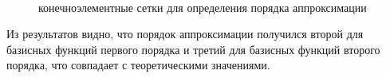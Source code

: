 \documentclass[a4paper,12pt]{article}
\begin{document}
\begin{figure}[H]
	\centering
	~~~~~
	\caption{конечноэлементные сетки для определения порядка аппроксимации}
	\label{fig:verify:x2_x4}
\end{figure}

Из результатов видно, что порядок аппроксимации получился второй для базисных функций первого порядка и третий для базисных функций второго порядка, что совпадает с теоретическими значениями.

\end{document}
